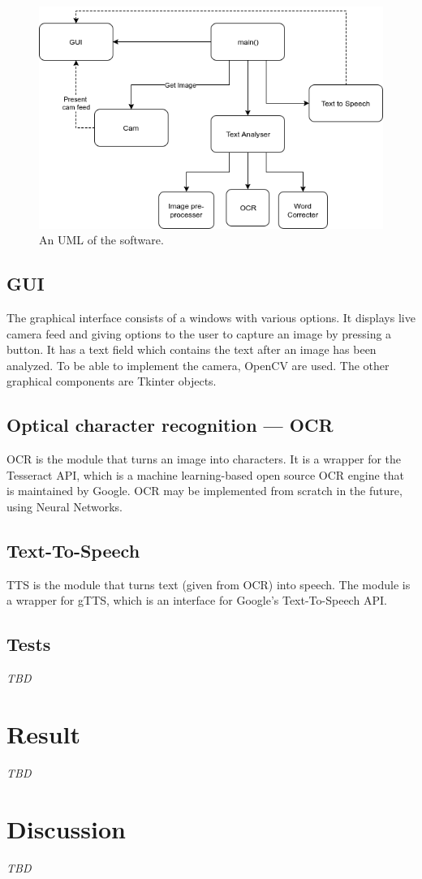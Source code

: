 \documentclass[a4paper, english, abstract=on]{scrartcl}
\begin{document}
\begin{figure}[h]
  \centering
  \caption{An UML of the software.\label{fig:main_uml}}
  \includegraphics[width=1.0\textwidth]{res/UML1}
\end{figure}

\subsection{GUI}
The graphical interface consists of a windows with various options. It
displays live camera feed and giving options to the user to capture an image
by pressing a button. It has a text field which contains the text after an
image has been analyzed. To be able to implement the camera, OpenCV are used.
The other graphical components are Tkinter objects.

\subsection{Optical character recognition --- OCR}
OCR is the module that turns an image into characters. It is a wrapper for the
Tesseract API, which is a  machine learning-based open source OCR engine that
is maintained by Google. OCR may be implemented from scratch in the future,
using Neural Networks.

\subsection{Text-To-Speech}
TTS is the module that turns text (given from OCR) into speech. The module is
a wrapper for gTTS, which is an interface for Google’s Text-To-Speech API.

\subsection{Tests}
\textit{TBD}

\section{Result}
\textit{TBD}

\section{Discussion}
\textit{TBD}

\pagebreak


\end{document}

